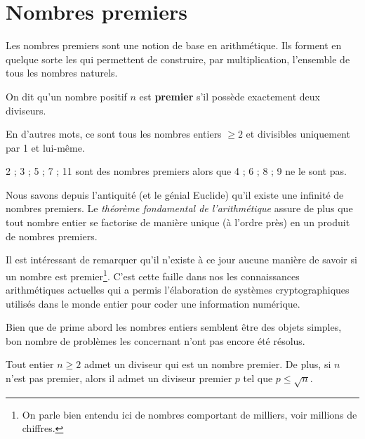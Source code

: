 \section{Nombres premiers}

Les nombres premiers sont une notion de base en arithmétique. Ils forment en quelque sorte les  qui permettent de construire, par multiplication, l'ensemble de tous les nombres naturels. 




\medskip



\begin{definition}
On dit qu'un nombre positif $n$ est \textbf{premier} s'il possède exactement deux diviseurs.

\medskip
En d'autres mots, ce sont tous les nombres entiers $\geqslant 2$ et divisibles uniquement par 1 et lui-même.
\end{definition}

\begin{exemple}
2 ; 3 ; 5 ; 7 ; 11 sont des nombres premiers alors que 4 ; 6 ; 8 ; 9 ne le sont pas.
\end{exemple}


\smallskip
Nous savons depuis l'antiquité (et le génial Euclide) qu'il existe une infinité de nombres premiers. Le \textit{théorème fondamental de l'arithmétique} assure de plus que tout nombre entier se factorise de manière unique (à l'ordre près) en un produit de nombres premiers.

\smallskip
Il est intéressant de remarquer qu'il n'existe à ce jour aucune manière  de savoir si un nombre est premier\footnote{On parle bien entendu ici de nombres comportant de milliers, voir millions de chiffres.}. C'est cette faille dans nos les connaissances arithmétiques actuelles qui a permis l'élaboration de systèmes cryptographiques utilisés dans le monde entier pour coder une information numérique. 

\smallskip
Bien que de prime abord les nombres entiers semblent être des objets simples, bon nombre de problèmes les concernant n'ont pas encore été résolus.


\begin{lemme}\label{lem:divpremier}
Tout entier $n \geqslant 2$ admet un diviseur qui est un nombre premier. De plus, si $n$ n'est pas premier, alors il admet un diviseur premier $p$ tel que $p \leq \sqrt{n}$.
\end{lemme}

